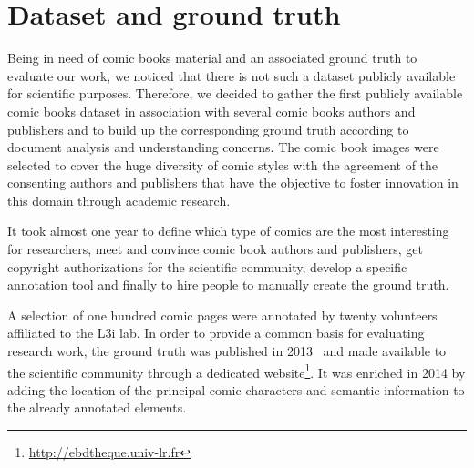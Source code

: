 

\section{Dataset and ground truth} %
\label{sec:dataset_and_ground_truth_construction}

Being in need of comic books material and an associated ground truth to evaluate our work, we noticed that there is not such a dataset publicly available for scientific purposes.
Therefore, we decided to gather the first publicly available comic books dataset in association with several comic books authors and publishers and to build up the corresponding ground truth according to document analysis and understanding concerns.
The comic book images were selected to cover the huge diversity of comic styles with the agreement of the consenting authors and publishers that have the objective to foster innovation in this domain through academic research.



It took almost one year to define which type of comics are the most interesting for researchers, meet and convince comic book authors and publishers, get copyright authorizations for the scientific community, develop a specific annotation tool and finally to hire people to manually create the ground truth.

A selection of one hundred comic pages were annotated by twenty volunteers affiliated to the L3i lab.
In order to provide a common basis for evaluating research work, the ground truth was published in 2013~\cite{Guerin2013} and made available to the scientific community through a dedicated website\footnote{\url{http://ebdtheque.univ-lr.fr}}.
It was enriched in 2014 by adding the location of the principal comic characters and semantic information to the already annotated elements.

